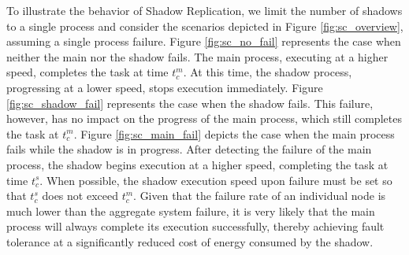 To illustrate the behavior of Shadow Replication, we limit the number of shadows to a single process and consider the scenarios depicted in Figure \ref{fig:sc_overview}, assuming a single process failure. Figure \ref{fig:sc_no_fail} represents the case when neither the main nor the shadow fails. The main process, executing
at a higher speed, completes the task at time $t_c^m$. At this time, the shadow process, progressing at a lower speed, stops execution immediately. Figure \ref{fig:sc_shadow_fail} represents the case when the shadow fails. This failure, however, has no impact on the progress of the main process, which still completes the task at $t_c^m$. Figure \ref{fig:sc_main_fail} depicts the case when the main process fails while the shadow is in progress. After detecting the failure of the main process, the shadow begins execution at a higher speed, completing the task at time $t_c^s$. When possible, the shadow execution speed upon failure must be set so that $t_c^s$ does not exceed $t_c^m$. Given that the failure rate of an individual node is much lower than
the aggregate system failure, it is very likely that the main process
will always complete its execution successfully, thereby achieving fault tolerance at a significantly reduced cost of energy consumed by the shadow. %




